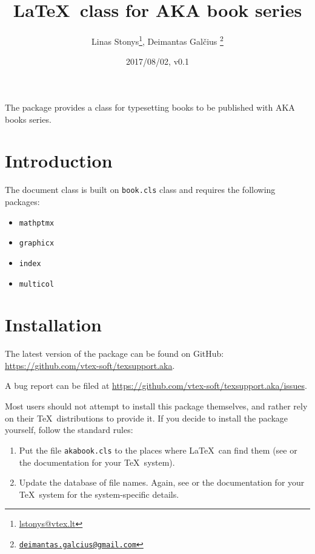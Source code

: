 \documentclass{ltxdoc}
\def\file#1{\texttt{#1}}
\begin{document}
\title{\LaTeX\ class for AKA book  series}
\author%
    {%
      Linas Stonys\footnote{\href{mailto:lstonys@vtex.lt}{lstonys@vtex.lt}},
      \space
      Deimantas Gal\v{c}ius%
      \footnote{\href{mailto:deimantas.galcius@gmail.com}{\texttt{deimantas.galcius@gmail.com}}}
    }
\date{2017/08/02, v0.1}
\maketitle

\abstract%
    {%
      The package provides a class for typesetting books
      to be published with AKA books series.
    }

\tableofcontents

\section{Introduction}

The document class is built on \file{book.cls} class and requires the following packages:

\begin{multicols}{2}
\begin{itemize}
\item \file{mathptmx}
\item \file{graphicx}
\item \file{index}
\item \file{multicol}
\end{itemize}
\end{multicols}



\section{Installation}

The latest version of the package can be found on GitHub: 
\url{https://github.com/vtex-soft/texsupport.aka}.

A bug report can be filed at \url{https://github.com/vtex-soft/texsupport.aka/issues}.

Most users should not attempt to install this package themselves, and rather rely on
their \TeX\ distributions to provide it. If you decide to install the package yourself, follow
the standard rules:
\begin{enumerate}
\item Put the file \file{akabook.cls}  to the places where \LaTeX\ 
can find them (see \cite{ref:ukfaq} or the documentation for your \TeX\ system).
\item Update the database of file names. Again, see \cite{ref:ukfaq} or the documentation for your
\TeX\ system for the system-specific details.
\end{enumerate}
\end{document}
